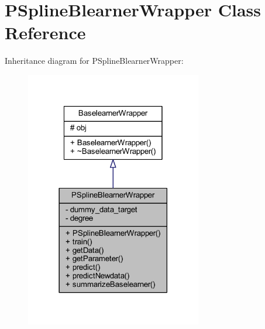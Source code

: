 \hypertarget{class_p_spline_blearner_wrapper}{}\section{P\+Spline\+Blearner\+Wrapper Class Reference}
\label{class_p_spline_blearner_wrapper}


Inheritance diagram for P\+Spline\+Blearner\+Wrapper\+:\nopagebreak
\begin{figure}[H]
\begin{center}
\leavevmode
\includegraphics[width=218pt]{class_p_spline_blearner_wrapper__inherit__graph}
\end{center}
\end{figure}


